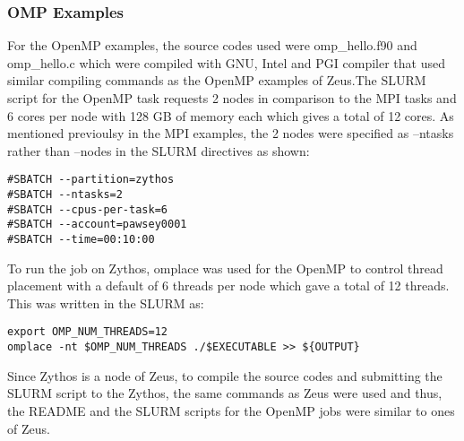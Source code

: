 \subsubsection{OMP Examples}

For the OpenMP examples, the source codes used were omp\_hello.f90 and omp\_hello.c which were compiled with GNU, Intel and PGI compiler that used similar
compiling commands as the OpenMP examples of Zeus.The SLURM script for the OpenMP task requests 2 nodes in comparison to the MPI tasks and 6 cores per node with 128 GB of memory each which gives a total 
of 12 cores. As mentioned previoulsy in the MPI examples, the 2 nodes were specified as --ntasks rather than --nodes in the SLURM directives as shown:

\begin{tcolorbox}
\begin{Verbatim}[fontsize=\scriptsize]
#SBATCH --partition=zythos
#SBATCH --ntasks=2
#SBATCH --cpus-per-task=6
#SBATCH --account=pawsey0001
#SBATCH --time=00:10:00
\end{Verbatim}
\end{tcolorbox}

To run the job on Zythos, omplace was used for the OpenMP to control thread placement with a default of 6 threads per node which gave a total of 12 
threads. This was written in the SLURM as:

\begin{tcolorbox}
\begin{Verbatim}[fontsize=\scriptsize]
export OMP_NUM_THREADS=12
omplace -nt $OMP_NUM_THREADS ./$EXECUTABLE >> ${OUTPUT}
\end{Verbatim}
\end{tcolorbox}

Since Zythos is a node of Zeus, to compile the source codes and submitting the SLURM script to the Zythos, the same commands as Zeus were used and thus,
the README and the SLURM scripts for the OpenMP jobs were similar to ones of Zeus.

